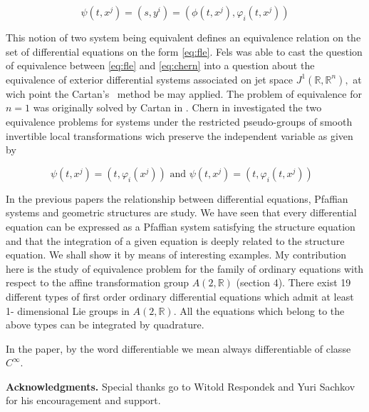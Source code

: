 \documentclass{amsproc}
\theoremstyle{remark}
\numberwithin{equation}{section}
\begin{document}
\begin{equation*}
\psi \left( t,x^{j}\right) =\left( s,y^{i}\right) =\left( \phi \left(
t,x^{j}\right) ,\varphi _{i}\left( t,x^{j}\right) \right)
\end{equation*}

This notion of two system being equivalent defines an equivalence relation
on the set of differential equations on the form \eqref{eq:fle}. Fels was able to
cast the question of equivalence between \eqref{eq:fle} and \eqref{eq:chern} into a question
about the equivalence of exterior differential systems associated on jet
space $J^{1}\left( 
\mathbb{R}
,\mathbb{R}
^{n}\right) ,$ at wich point the Cartan's \ method \cite{Ca1, EKMR, Ga, GS, Ol2, QT}                                             be may applied. The problem of equivalence for $n=1$ was
originally solved by Cartan in \cite{Ca1}. Chern in \cite{Ch} investigated the two
equivalence problems for systems under the restricted pseudo-groups of
smooth invertible local transformations wich preserve the independent
variable as given by

\begin{equation*}
\psi \left( t,x^{j}\right) =\left( t,\varphi _{i}\left( x^{j}\right) \right) 
\text{ and }\psi \left( t,x^{j}\right) =\left( t,\varphi _{i}\left(
t,x^{j}\right) \right) \text{ }
\end{equation*}

In the previous papers \cite{Ab1, Ab2} the relationship between differential
equations, Pfaffian systems and geometric structures are study. We have seen
that every differential equation can be expressed as a Pfaffian system
satisfying the structure equation and that the integration of a given
equation is deeply related to the structure equation. We shall show it by
means of interesting examples. My contribution here is the study of
equivalence problem for the family of ordinary equations with respect to the
affine transformation group $A\left( 2,\mathbb{R}
\right) $ (section 4). There exist 19 different types of first order
ordinary differential equations which admit at least 1- dimensional Lie
groups in $A\left( 2,\mathbb{R}
\right) $. All the equations which belong to the above types can be
integrated by quadrature.

In the paper, by the word differentiable we mean always differentiable of
classe $C^{\infty }$.

\textbf{Acknowledgments. }Special thanks go to Witold Respondek and Yuri
Sachkov for his encouragement and support.
\end{document}
